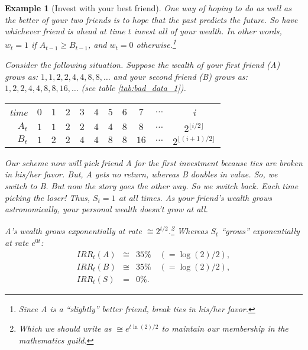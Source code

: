\documentclass{book}
\newtheorem{example}{Example}[chapter]
\begin{document}
\begin{example}[Invest with your best friend]  One way of hoping to do
  as well as the better of your two friends is to hope that the past
  predicts the future.  So have whichever friend is ahead at time $t$
  invest all of your wealth.  In other words, $w_{t}= 1$
  if $A_{t-1}\ge B_{t-1}$, and $w_{t}= 0$ otherwise.\footnote{Since A
    is a ``slightly'' better friend, break ties in his/her favor.}

  Consider the following situation.  Suppose the wealth of your first
  friend (A) grows as: $1,1,2,2,4,4,8,8,\ldots$ and your second friend
  (B) grows as: $1,2,2,4,4,8,8,16,\ldots$ (see table
  \ref{tab:bad_data_1}). 
  \begin{table*}[htbp]
    \begin{center}
      \leavevmode
      \begin{tabular}{r|c|c|c|c|c|c|c|c|c|c}
        time & $0$ & $  1 $ & $  2 $ & $  3 $ & $  4 $ & $  5 $ & $  6
        $ & $  7 $ & $  \ldots $ & i\\ 
        $A_t $ & $  1 $ & $  1 $ & $  2 $ & $  2 $ & $  4 $ & $  4 $ &
        $  8 $ & $  8 $ & $  \ldots $ & $2^{\lfloor i/2 \rfloor}$\\ 
        $B_t $ & $  1 $ & $  2 $ & $  2 $ & $  4 $ & $  4 $ & $  8 $ &
        $  8 $ & $  16$ & $ \ldots $ & $2^{\lfloor (i+1)/2 \rfloor}$
      \end{tabular}
    \end{center}
    \caption[First bad data]{First bad data sequence}
    \label{tab:bad_data_1}
  \end{table*}%
  Our scheme now will pick friend A for the first investment because
  ties are broken in his/her favor.  But, A gets no return, whereas B
  doubles in value.  So, we switch to B.  But now the story goes the
  other way.  So we switch back.  Each time picking the loser!  Thus,
  $S_{t}= 1$ at all times.  As your friend's wealth grows
  astronomically, your personal wealth doesn't grow at all.

  A's wealth grows exponentially at rate $\cong
  2^{t/2}$.\footnote{Which we should write as $\cong e^{t \ln(2)/2}$ to
    maintain our membership in the mathematics guild.} Whereas 
  $S_{t}$ ``grows'' exponentially at rate $e^{0t}$:
  \begin{eqnarray*}
    IRR_t(A) &\cong & 35\% \quad (=\log(2)/2), \\
    IRR_t(B) &\cong & 35\% \quad (=\log(2)/2), \\
    IRR_t(S) &  =   & 0\%.
  \end{eqnarray*}

\end{example}
\end{document}
